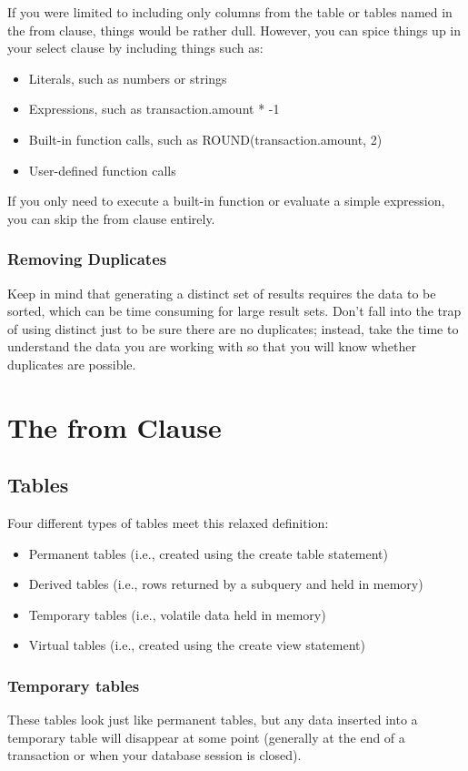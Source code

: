 If you were limited to including only columns from the table or tables named in the from clause, things would be rather dull. However, you can spice things up in your select clause by including things such as:

\begin{itemize}
    \item Literals, such as numbers or strings
    \item Expressions, such as transaction.amount * -1
    \item Built-in function calls, such as ROUND(transaction.amount, 2)
    \item User-defined function calls
\end{itemize}

If you only need to execute a built-in function or evaluate a simple expression, you can skip the from clause entirely.

\subsubsection*{Removing Duplicates}
\begin{tcolorbox}
    Keep in mind that generating a distinct set of results requires the data to be sorted, which can be time consuming for large result sets. Don't fall into the trap of using distinct just to be sure there are no duplicates; instead, take the time to understand the data you are working with so that you will know whether duplicates are possible.
\end{tcolorbox}
\section{The from Clause}
\subsection{Tables}
Four different types of tables meet this relaxed definition:
\begin{itemize}
    \item  Permanent tables (i.e., created using the create table statement)
    \item  Derived tables (i.e., rows returned by a subquery and held in memory)
    \item  Temporary tables (i.e., volatile data held in memory)
    \item  Virtual tables (i.e., created using the create view statement)
\end{itemize}
\subsubsection*{Temporary tables}
These tables look just like permanent tables, but any data inserted into a temporary table will disappear at some point (generally at the end of a transaction or when your database session is closed).

